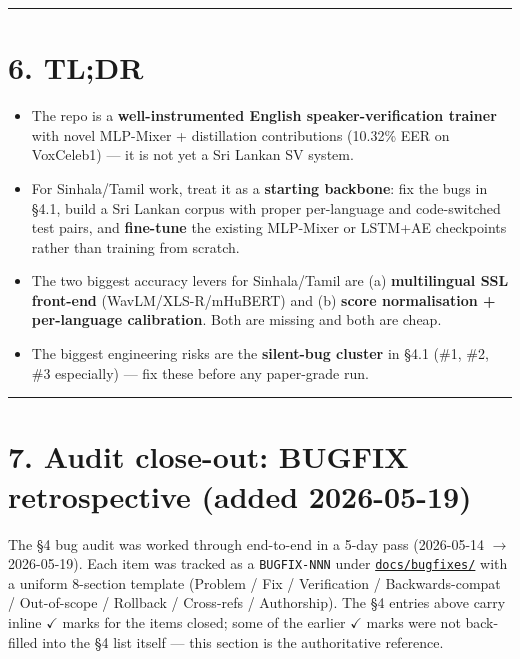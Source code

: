 \documentclass[10pt,a4paper]{article}
\begin{document}
\vspace{0.5em}\hrule\vspace{0.5em}

\section*{6. TL;DR}

\begin{itemize}[leftmargin=*,itemsep=2pt]
  \item The repo is a \textbf{well-instrumented English speaker-verification trainer} with novel MLP-Mixer + distillation contributions (10.32\% EER on VoxCeleb1) --- it is not yet a Sri Lankan SV system.
  \item For Sinhala/Tamil work, treat it as a \textbf{starting backbone}: fix the bugs in §4.1, build a Sri Lankan corpus with proper per-language and code-switched test pairs, and \textbf{fine-tune} the existing MLP-Mixer or LSTM+AE checkpoints rather than training from scratch.
  \item The two biggest accuracy levers for Sinhala/Tamil are (a) \textbf{multilingual SSL front-end} (WavLM/XLS-R/mHuBERT) and (b) \textbf{score normalisation + per-language calibration}. Both are missing and both are cheap.
  \item The biggest engineering risks are the \textbf{silent-bug cluster} in §4.1 (\#1, \#2, \#3 especially) --- fix these before any paper-grade run.
\end{itemize}

\vspace{0.5em}\hrule\vspace{0.5em}

\section*{7. Audit close-out: BUGFIX retrospective (added 2026-05-19)}

The §4 bug audit was worked through end-to-end in a 5-day pass (2026-05-14 $\rightarrow$ 2026-05-19). Each item was tracked as a \texttt{BUGFIX-NNN} under \href{docs/bugfixes/}{\texttt{docs/bugfixes/}} with a uniform 8-section template (Problem / Fix / Verification / Backwards-compat / Out-of-scope / Rollback / Cross-refs / Authorship). The §4 entries above carry inline {\color{green!50!black}$\checkmark$} marks for the items closed; some of the earlier {\color{green!50!black}$\checkmark$} marks were not back-filled into the §4 list itself --- this section is the authoritative reference.
\end{document}
